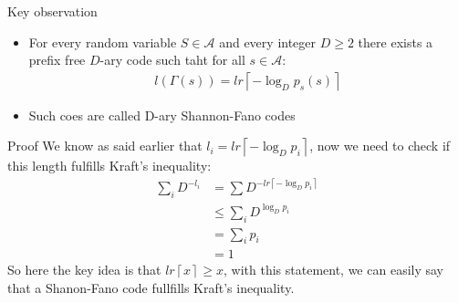 \begin{parag}{Key observation}
    \begin{theoreme}
        \begin{itemize}
            \item For every random variable $S \in \mathcal{A}$ and every integer $D \geq 2$ there exists a prefix free $D$-ary code such taht for all $s \in \mathcal{A}$:
                \begin{align*} l\left(\Gamma\left(s\right)\right) = lr\left\lceil -\log_Dp_s\left(s\right) \right\rceil  \end{align*}
            \item Such coes are called D-ary Shannon-Fano codes
        \end{itemize}
    \end{theoreme}
    \begin{subparag}{Proof}
        We know as said earlier that $l_i =  lr\left\lceil - \log_Dp_i \right\rceil $, now we need to check if this length fulfills Kraft's inequality:
        \begin{align*} 
            \sum_{i}D^{-l_i} &=  \sum D^{- lr\left\lceil - \log_D p_i \right\rceil }  \\
            &\leq \sum_{i} D^{\log_Dp_i}\\
            &= \sum_{i} p_i\\
            &= 1
        \end{align*}
        So here the key idea is that $lr\left\lceil x \right\rceil \geq x$, with this statement, we can easily say that a Shanon-Fano code fullfills Kraft's inequality. 
    \end{subparag}
\end{parag}

